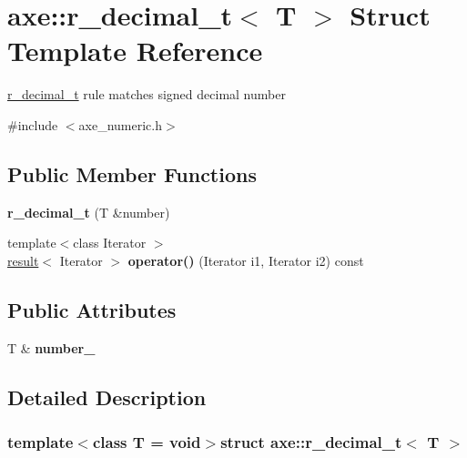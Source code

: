 \hypertarget{structaxe_1_1r__decimal__t}{\section{axe\+:\+:r\+\_\+decimal\+\_\+t$<$ T $>$ Struct Template Reference}
\label{structaxe_1_1r__decimal__t}
}


\hyperlink{structaxe_1_1r__decimal__t}{r\+\_\+decimal\+\_\+t} rule matches signed decimal number  




{\ttfamily \#include $<$axe\+\_\+numeric.\+h$>$}

\subsection*{Public Member Functions}
\begin{DoxyCompactItemize}
\item 
\hypertarget{structaxe_1_1r__decimal__t_ab59a3945ab3c41eb37409f03b0fa8b26}{{\bfseries r\+\_\+decimal\+\_\+t} (T \&number)}\label{structaxe_1_1r__decimal__t_ab59a3945ab3c41eb37409f03b0fa8b26}

\item 
\hypertarget{structaxe_1_1r__decimal__t_a374d966090c14bcce1bd54f58d60ed8c}{{\footnotesize template$<$class Iterator $>$ }\\\hyperlink{structaxe_1_1result}{result}$<$ Iterator $>$ {\bfseries operator()} (Iterator i1, Iterator i2) const }\label{structaxe_1_1r__decimal__t_a374d966090c14bcce1bd54f58d60ed8c}

\end{DoxyCompactItemize}
\subsection*{Public Attributes}
\begin{DoxyCompactItemize}
\item 
\hypertarget{structaxe_1_1r__decimal__t_a1fe729e8a0a2b1c3846a5bdcd2c94ee3}{T \& {\bfseries number\+\_\+}}\label{structaxe_1_1r__decimal__t_a1fe729e8a0a2b1c3846a5bdcd2c94ee3}

\end{DoxyCompactItemize}


\subsection{Detailed Description}
\subsubsection*{template$<$class T = void$>$struct axe\+::r\+\_\+decimal\+\_\+t$<$ T $>$}

